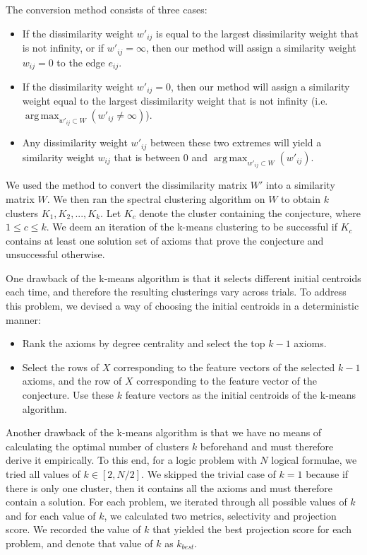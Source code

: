 \documentclass[EPiC]{easychair}
\DeclareMathOperator*{\argmaxA}{arg\,max} %
\begin{document}
The conversion method consists of three cases:
\begin{itemize}
\item If the dissimilarity weight $w'_{ij}$ is equal to the largest 
dissimilarity weight that is not infinity, or if $w'_{ij} = \infty$, then 
our method will assign a similarity weight $w_{ij} = 0$ to the edge $e_{ij}$.

\item If the dissimilarity weight $w'_{ij} = 0$, then our method will assign 
a similarity weight equal to the largest dissimilarity weight that is not 
infinity (i.e. $\argmaxA_{w'_{ij} \subset W} (w'_{ij} \neq \infty)$).

\item Any dissimilarity weight $w'_{ij}$ between these two extremes will 
yield a similarity weight $w_{ij}$ that is between 
$0$ and $\argmaxA_{w'_{ij} \subset W} (w'_{ij})$.
\end{itemize}

We used the method to convert the dissimilarity matrix $W'$ into a similarity
matrix $W$. We then ran the spectral clustering algorithm on $W$ 
to obtain $k$ clusters $K_{1}, K_{2}, ..., K_{k}$. Let $K_{c}$ denote the 
cluster containing the conjecture, where $1 \leq c \leq k$. We deem an
iteration of the k-means clustering to be successful if $K_{c}$ contains at 
least one solution set of axioms that prove the conjecture and unsuccessful 
otherwise.

One drawback of the k-means algorithm is that it selects different initial 
centroids each time, and therefore the resulting clusterings vary across 
trials. To address this problem, we devised a way of choosing the initial 
centroids in a deterministic manner:
\begin{itemize}
\item Rank the axioms by degree centrality and select the top $k-1$ axioms.
\item Select the rows of $X$ corresponding to the feature vectors of the
selected $k-1$ axioms, and the row of $X$ corresponding to the feature vector 
of the conjecture. Use these $k$ feature vectors as the initial centroids of 
the k-means algorithm. 
\end{itemize}

Another drawback of the k-means algorithm is that we have no means of 
calculating the optimal number of clusters $k$ beforehand and must therefore 
derive it empirically. To this end, for a logic problem with $N$ logical 
formulae, we tried all values of $k \in [2, N/2]$. We skipped the trivial 
case of $k=1$ because if there is only one cluster, then it contains all the 
axioms and must therefore contain a solution. For each problem, we iterated
through all possible values of $k$ and for each value of $k$, we calculated 
two metrics, selectivity and projection score. We recorded the value of $k$
that yielded the best projection score for each problem, and denote that 
value of $k$ as $k_{best}$. 
\end{document}
